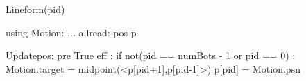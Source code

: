 Lineform(pid)

using Motion:
...
allread:
  pos p$\label{lineformp}$

Updatepos:
  pre True
  eff :
     if not(pid == numBots - 1 or pid == 0) :
        Motion.target = midpoint(<p[pid+1],p[pid-1]>)
    p[pid] = Motion.psn

